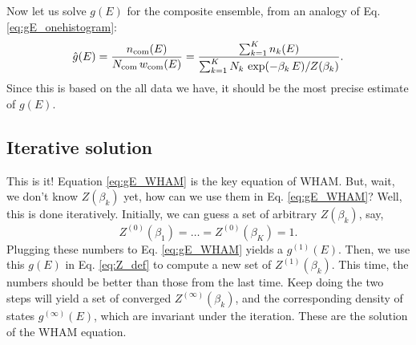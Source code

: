 \documentclass[aip,jcp,preprint,superscriptaddress]{revtex4-1}
\begin{document}
Now let us solve $g(E)$
for the composite ensemble,
from an analogy of Eq. \eqref{eq:gE_onehistogram}:
%
\begin{align}
\hat g(E)
=
\frac{ n_{\mathrm{com}}(E) }
{ N_{\mathrm{com}} \, w_{\mathrm{com}}(E) }
=
\frac{ \sum_{k = 1}^K n_k(E) }
{ \sum_{k = 1}^K N_k \, \exp( -\beta_k \, E ) / Z(\beta_k) }.
\label{eq:gE_WHAM}
\end{align}
%
Since this is based on the all data we have,
it should be the most precise estimate of $g(E)$.




\subsection{Iterative solution}


This is it!
%
Equation \eqref{eq:gE_WHAM} is the key equation of WHAM.
%
But, wait, we don't know $Z(\beta_k)$ yet,
how can we use them in Eq. \eqref{eq:gE_WHAM}?
%
Well, this is done iteratively.
%
Initially,
we can guess a set of arbitrary $Z(\beta_k)$,
say,
\[
  Z^{(0)}(\beta_1) = \dots = Z^{(0)}(\beta_K) = 1.
\]
%
Plugging these numbers to Eq. \eqref{eq:gE_WHAM}
yields a $g^{(1)}(E)$.
%
Then, we use this $g(E)$ in Eq. \eqref{eq:Z_def}
to compute a new set of
$Z^{(1)}(\beta_k)$.
%
This time, the numbers should be better
than those from the last time.
%
Keep doing the two steps will yield
a set of converged
$Z^{(\infty)}(\beta_k)$,
and the corresponding density of states
$g^{(\infty)}(E)$,
which are invariant under the iteration.
%
These are the solution of the WHAM equation.








\end{document}
